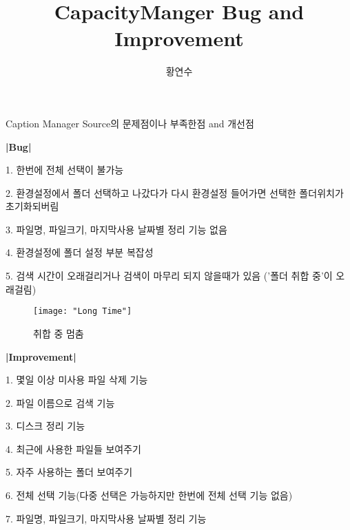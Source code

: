 \documentclass[letterpaper, 11pt]{article} %
\title{CapacityManger Bug and Improvement}
\author{황연수}
\begin{document}
	
	\maketitle \LARGE Caption Manager Source의 문제점이나 부족한점 and 개선점	\newline
	
	\bf |Bug| \newline
	
	\large 1. 한번에 전체 선택이 불가능 \newline
	
           2. 환경설정에서 폴더 선택하고 나갔다가 다시 환경설정 들어가면
			  선택한 폴더위치가 초기화되버림 \newline
	
		   3. 파일명, 파일크기, 마지막사용 날짜별 정리 기능 없음 \newline
	
		   4. 환경설정에 폴더 설정 부분 복잡성 \newline
	
		   5. 검색 시간이 오래걸리거나 검색이 마무리 되지 않을때가 있음
		   ('폴더 취합 중'이 오래걸림) \newline \newline
		   
	\begin{figure}[h]
		
		\centering
		
		\texttt{[image: "Long Time"]}
		
		\caption{취합 중 멈춤}
		
		\label{fig:long-time}
		
	\end{figure}

	\newpage
       
	\bf \LARGE |Improvement| \newline
	 
	\large 1. 몇일 이상 미사용 파일 삭제 기능 \newline
	
	       2. 파일 이름으로 검색 기능 \newline
	       
		   3. 디스크 정리 기능 \newline
		   
		   4. 최근에 사용한 파일들 보여주기 \newline
		   
		   5. 자주 사용하는 폴더 보여주기 \newline
		   
		   6. 전체 선택 기능(다중 선택은 가능하지만 한번에 전체 선택 기능 없음) \newline
		   
		   7. 파일명, 파일크기, 마지막사용 날짜별 정리 기능
	
\end{document}
